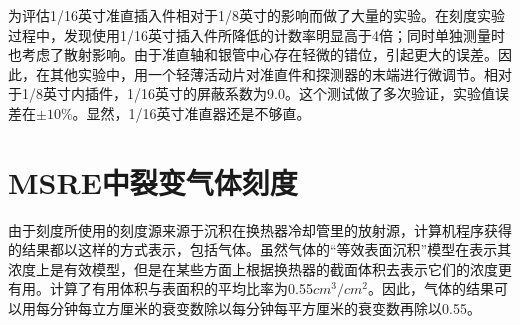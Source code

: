 为评估1/16英寸准直插入件相对于1/8英寸的影响而做了大量的实验。在刻度实验过程中，发现使用1/16英寸插入件所降低的计数率明显高于4倍；同时单独测量时也考虑了散射影响。由于准直轴和银管中心存在轻微的错位，引起更大的误差。因此，在其他实验中，用一个轻薄活动片对准直件和探测器的末端进行微调节。相对于1/8英寸内插件，1/16英寸的屏蔽系数为9.0。这个测试做了多次验证，实验值误差在$\pm10$\%。显然，1/16英寸准直器还是不够直。


\section{MSRE中裂变气体刻度}

由于刻度所使用的刻度源来源于沉积在换热器冷却管里的放射源，计算机程序获得的结果都以这样的方式表示，包括气体。虽然气体的“等效表面沉积”模型在表示其浓度上是有效模型，但是在某些方面上根据换热器的截面体积去表示它们的浓度更有用。计算了有用体积与表面积的平均比率为0.55$cm^3/cm^2$。因此，气体的结果可以用每分钟每立方厘米的衰变数除以每分钟每平方厘米的衰变数再除以0.55。


